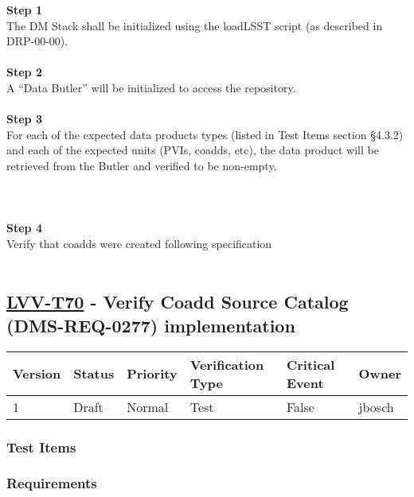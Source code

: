 \textbf{Step 1}\\
The DM Stack shall be initialized using the loadLSST script (as
described in DRP-00-00).\\
~\\
\textbf{Step 2}\\
A ``Data Butler'' will be initialized to access the repository.\\
~\\
\textbf{Step 3}\\
For each of the expected data products types (listed in Test Items
section §4.3.2) and each of the expected units (PVIs, coadds, etc), the
data product will be retrieved from the Butler and verified to be
non-empty.\\
~\\
~\\
~\\
\textbf{Step 4}\\
Verify that coadds were created following specification\\
~\\

\hypertarget{lvv-t70---verify-coadd-source-catalog-dms-req-0277-implementation}{%
\subsection{\texorpdfstring{\href{https://jira.lsstcorp.org/secure/Tests.jspa\#/testCase/LVV-T70}{LVV-T70}
- Verify Coadd Source Catalog (DMS-REQ-0277)
implementation}{LVV-T70 - Verify Coadd Source Catalog (DMS-REQ-0277) implementation}}\label{lvv-t70---verify-coadd-source-catalog-dms-req-0277-implementation}}

\begin{longtable}[]{@{}llllll@{}}
\toprule
Version & Status & Priority & Verification Type & Critical Event &
Owner\tabularnewline
\midrule
\endhead
1 & Draft & Normal & Test & False & jbosch\tabularnewline
\bottomrule
\end{longtable}

\hypertarget{test-items-7}{%
\subsubsection{Test Items}\label{test-items-7}}

\hypertarget{requirements-14}{%
\subsubsection{Requirements}\label{requirements-14}}

